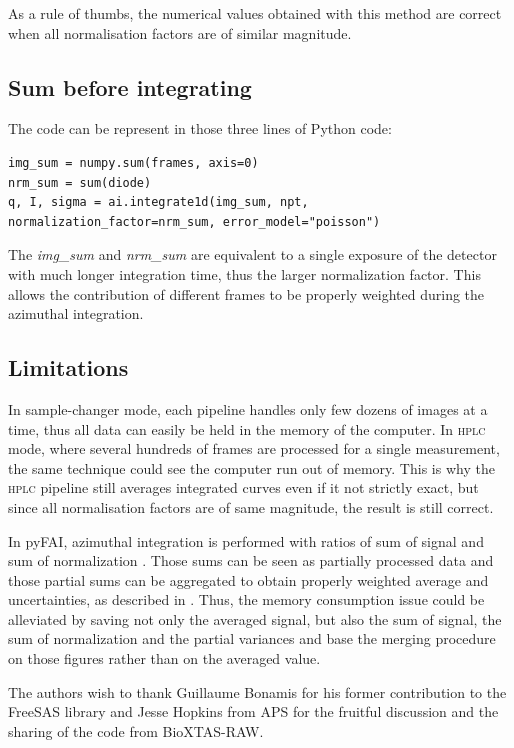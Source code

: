 \documentclass[preprint]{iucr}              %
\begin{document}
As a rule of thumbs, the numerical values obtained with this method are correct when all normalisation factors are of similar magnitude.

\subsection{Sum before integrating}
The code can be represent in those three lines of Python code:
\begin{verbatim} 
img_sum = numpy.sum(frames, axis=0)
nrm_sum = sum(diode)
q, I, sigma = ai.integrate1d(img_sum, npt, normalization_factor=nrm_sum, error_model="poisson")
\end{verbatim}

The \textit{img\_sum} and \textit{nrm\_sum} are equivalent to a single exposure of the detector with much longer integration time, thus the larger normalization factor. 
This allows the contribution of different frames to be properly weighted during the azimuthal integration. 


\subsection{Limitations}
In sample-changer mode, each pipeline handles only few dozens of images at a time, thus all data can easily be held in the memory of the computer.
In \textsc{hplc} mode, where several hundreds of frames are processed for a single measurement, the same technique could see the computer run out of memory.
This is why the \textsc{hplc} pipeline still averages integrated curves even if it not strictly exact, but since all normalisation factors are of same magnitude, the result is still correct.  

In pyFAI, azimuthal integration is performed with ratios of sum of signal and sum of normalization \cite{pyfai_2020}.
Those sums can be seen as partially processed data and those partial sums can be aggregated to obtain properly weighted average and uncertainties, as described in .
Thus, the memory consumption issue could be alleviated by saving not only the averaged signal, but also the sum of signal, the sum of normalization and the partial variances and base the merging procedure on those figures rather than on the averaged value.

The authors wish to thank Guillaume Bonamis for his former contribution to the FreeSAS library and Jesse Hopkins from APS for the fruitful discussion and the  sharing of the code from BioXTAS-RAW.



\end{document}
